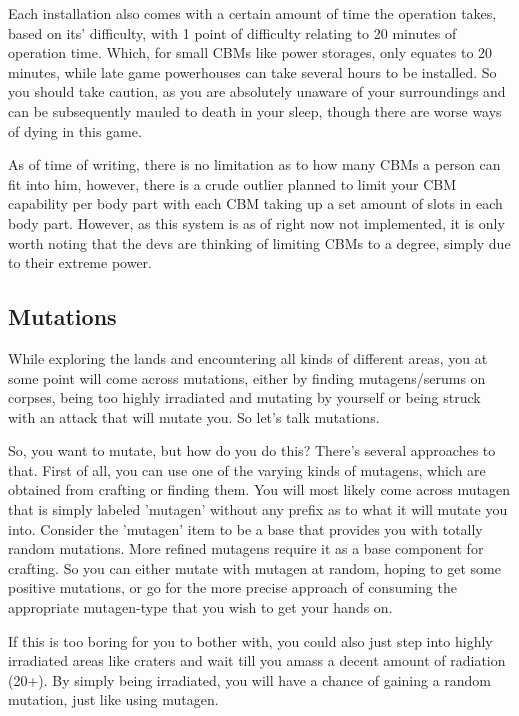 Each installation also comes with a certain amount of time the operation takes, based on its' difficulty, with 1 point of difficulty relating to 20 minutes of operation time. Which, for small CBMs like power storages, only equates to 20 minutes, while late game powerhouses can take several hours to be installed. So you should take caution, as you are absolutely unaware of your surroundings and can be subsequently mauled to death in your sleep, though there are worse ways of dying in this game.

As of time of writing, there is no limitation as to how many CBMs a person can fit into him, however, there is a crude outlier planned to limit your CBM capability per body part with each CBM taking up a set amount of slots in each body part. However, as this system is as of right now not implemented, it is only worth noting that the devs are thinking of limiting CBMs to a degree, simply due to their extreme power.

\subsection{Mutations}

While exploring the lands and encountering all kinds of different areas, you at some point will come across mutations, either by finding mutagens/serums on corpses, being too highly irradiated and mutating by yourself or being struck with an attack that will mutate you. So let's talk mutations.

So, you want to mutate, but how do you do this?
There's several approaches to that. First of all, you can use one of the varying kinds of mutagens, which are obtained from crafting or finding them. You will most likely come across mutagen that is simply labeled 'mutagen' without any prefix as to what it will mutate you into. Consider the 'mutagen' item to be a base that provides you with totally random mutations. More refined mutagens require it as a base component for crafting. So you can either mutate with mutagen at random, hoping to get some positive mutations, or go for the more precise approach of consuming the appropriate mutagen-type that you wish to get your hands on.

If this is too boring for you to bother with, you could also just step into highly irradiated areas like craters and wait till you amass a decent amount of radiation (20+). By simply being irradiated, you will have a chance of gaining a random mutation, just like using mutagen.

